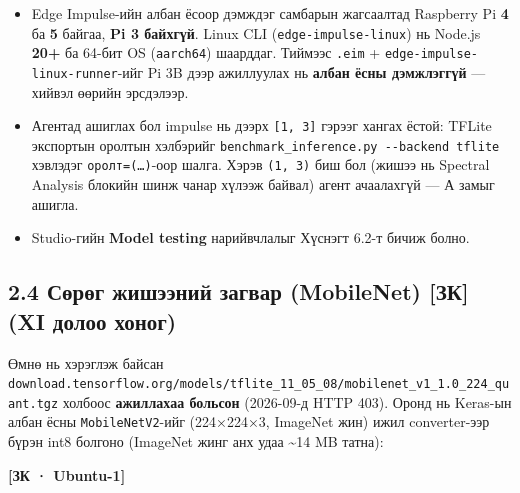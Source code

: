 \begin{itemize}
\tightlist
\item
  Edge Impulse-ийн албан ёсоор дэмждэг самбарын жагсаалтад Raspberry Pi \textbf{4} ба \textbf{5} байгаа, \textbf{Pi 3 байхгүй}. Linux CLI (\texttt{edge-impulse-linux}) нь Node.js \textbf{20+} ба 64-бит OS (\texttt{aarch64}) шаарддаг. Тиймээс \texttt{.eim} + \texttt{edge-impulse-linux-runner}-ийг Pi 3B дээр ажиллуулах нь \textbf{албан ёсны дэмжлэггүй} --- хийвэл өөрийн эрсдэлээр.
\item
  Агентад ашиглах бол impulse нь дээрх \texttt{{[}1,\ 3{]}} гэрээг хангах ёстой: TFLite экспортын оролтын хэлбэрийг \texttt{benchmark\_\allowbreak{}inference.\allowbreak{}py\ -\/\allowbreak{}-backend\ tflite} хэвлэдэг \texttt{оролт=(\ldots{})}-оор шалга. Хэрэв \texttt{(1,\ 3)} биш бол (жишээ нь Spectral Analysis блокийн шинж чанар хүлээж байвал) агент ачаалахгүй --- А замыг ашигла.
\item
  Studio-гийн \textbf{Model testing} нарийвчлалыг Хүснэгт 6.2-т бичиж болно.
\end{itemize}

\hypertarget{ux441ux4e9ux440ux4e9ux433-ux436ux438ux448ux44dux44dux43dux438ux439-ux437ux430ux433ux432ux430ux440-mobilenet-ux437ux43a-xi-ux434ux43eux43bux43eux43e-ux445ux43eux43dux43eux433}{%
\subsection{2.4 Сөрөг жишээний загвар (MobileNet) {[}ЗК{]} (XI долоо хоног)}\label{ux441ux4e9ux440ux4e9ux433-ux436ux438ux448ux44dux44dux43dux438ux439-ux437ux430ux433ux432ux430ux440-mobilenet-ux437ux43a-xi-ux434ux43eux43bux43eux43e-ux445ux43eux43dux43eux433}}

Өмнө нь хэрэглэж байсан \texttt{download.\allowbreak{}tensorflow.\allowbreak{}org/\allowbreak{}models/\allowbreak{}tflite\_\allowbreak{}11\_\allowbreak{}05\_\allowbreak{}08/\allowbreak{}mobilenet\_\allowbreak{}v1\_\allowbreak{}1.\allowbreak{}0\_\allowbreak{}224\_\allowbreak{}quant.\allowbreak{}tgz} холбоос \textbf{ажиллахаа больсон} (2026-09-д HTTP 403). Оронд нь Keras-ын албан ёсны \texttt{MobileNetV2}-ийг (224×224×3, ImageNet жин) ижил converter-ээр бүрэн int8 болгоно (ImageNet жинг анх удаа \textasciitilde14 MB татна):

\textbf{{[}ЗК · Ubuntu-1{]}}

\begin{Shaded}
\begin{Highlighting}[]
\end{Highlighting}
\end{Shaded}

